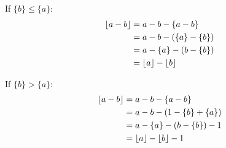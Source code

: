 \documentclass[11pt]{amsart}
\begin{document}
If $\{b\} \le \{a\}$:
$$
\begin{aligned}
 \left\lfloor {a - b} \right\rfloor  &= a - b - \{a - b\}
\\
& = a - b - (\{a\} - \{b\})
\\
& = a  - \{a\} - (b - \{b\})
\\
& =  \left\lfloor {a} \right\rfloor  -  \left\lfloor {b} \right\rfloor 
\end{aligned}
$$

If $\{b\} > \{a\}$:
$$
\begin{aligned}
 \left\lfloor {a - b} \right\rfloor  &= a - b - \{a - b\}
\\
& = a - b - ( 1 - \{b\} + \{a\})
\\
& = a  - \{a\} - (b - \{b\}) - 1
\\
& =  \left\lfloor {a} \right\rfloor  -  \left\lfloor {b} \right\rfloor  - 1
\end{aligned}
$$
\end{document}
